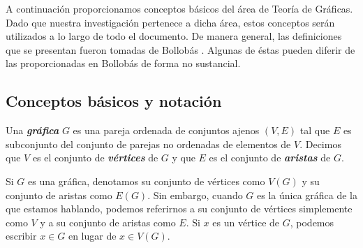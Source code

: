



A continuación proporcionamos conceptos básicos del área de Teoría de Gráficas. Dado que nuestra investigación pertenece a dicha área, estos conceptos serán utilizados a lo largo de todo el documento. De manera general, las definiciones que se presentan fueron tomadas de Bollobás \cite{Bollobas}. Algunas de éstas pueden diferir de las proporcionadas en Bollobás \cite{Bollobas} de forma no sustancial.

\subsection{Conceptos básicos y notación}

Una \textbf{\emph{gráfica}} $G$ es una pareja ordenada de conjuntos ajenos $(V,E)$ tal que $E$ es subconjunto del conjunto de parejas no ordenadas de elementos de $V$. Decimos que $V$ es el conjunto de \textbf{\emph{vértices}} de $G$ y que $E$ es el conjunto de \textbf{\emph{aristas}} de $G$. 

Si $G$ es una gráfica, denotamos su conjunto de vértices como $V(G)$ y su conjunto de aristas como $E(G)$. Sin embargo, cuando $G$ es la única gráfica de la que estamos hablando, podemos referirnos a su conjunto de vértices simplemente como $V$ y a su conjunto de aristas como $E$. Si $x$ es un vértice de $G$, podemos escribir $x\in G$ en lugar de $x \in V(G)$. 

